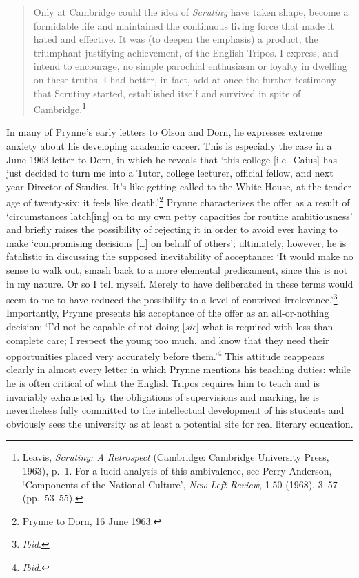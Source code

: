 \documentclass[]{article}
\begin{document}
\begin{quote}
Only at Cambridge could the idea of \emph{Scrutiny} have taken shape,
become a formidable life and maintained the continuous living force that
made it hated and effective. It was (to deepen the emphasis) a product,
the triumphant justifying achievement, of the English Tripos. I express,
and intend to encourage, no simple parochial enthusiasm or loyalty in
dwelling on these truths. I had better, in fact, add at once the further
testimony that Scrutiny started, established itself and survived in
spite of Cambridge.\footnote{Leavis, \emph{Scrutiny: A Retrospect}
  (Cambridge: Cambridge University Press, 1963), p.~1. For a lucid
  analysis of this ambivalence, see Perry Anderson, `Components of the
  National Culture', \emph{New Left Review}, 1.50 (1968), 3--57
  (pp.~53--55).}
\end{quote}

\noindent In many of Prynne's early letters to Olson and Dorn, he
expresses extreme anxiety about his developing academic career. This is
especially the case in a June 1963 letter to Dorn, in which he reveals
that `this college {[}i.e.~Caius{]} has just decided to turn me into a
Tutor, college lecturer, official fellow, and next year Director of
Studies. It's like getting called to the White House, at the tender age
of twenty-six; it feels like death.'\footnote{Prynne to Dorn, 16 June
  1963.} Prynne characterises the offer as a result of `circumstances
latch{[}ing{]} on to my own petty capacities for routine ambitiousness'
and briefly raises the possibility of rejecting it in order to avoid
ever having to make `compromising decisions {[}\ldots{}{]} on behalf of
others'; ultimately, however, he is fatalistic in discussing the
supposed inevitability of acceptance: `It would make no sense to walk
out, smash back to a more elemental predicament, since this is not in my
nature. Or so I tell myself. Merely to have deliberated in these terms
would seem to me to have reduced the possibility to a level of contrived
irrelevance.'\footnote{\emph{Ibid}.} Importantly, Prynne presents his
acceptance of the offer as an all-or-nothing decision: `I'd not be
capable of not doing {[}\emph{sic}{]} what is required with less than
complete care; I respect the young too much, and know that they need
their opportunities placed very accurately before them.'\footnote{\emph{Ibid}.}
This attitude reappears clearly in almost every letter in which Prynne
mentions his teaching duties: while he is often critical of what the
English Tripos requires him to teach and is invariably exhausted by the
obligations of supervisions and marking, he is nevertheless fully
committed to the intellectual development of his students and obviously
sees the university as at least a potential site for real literary
education.
\end{document}
